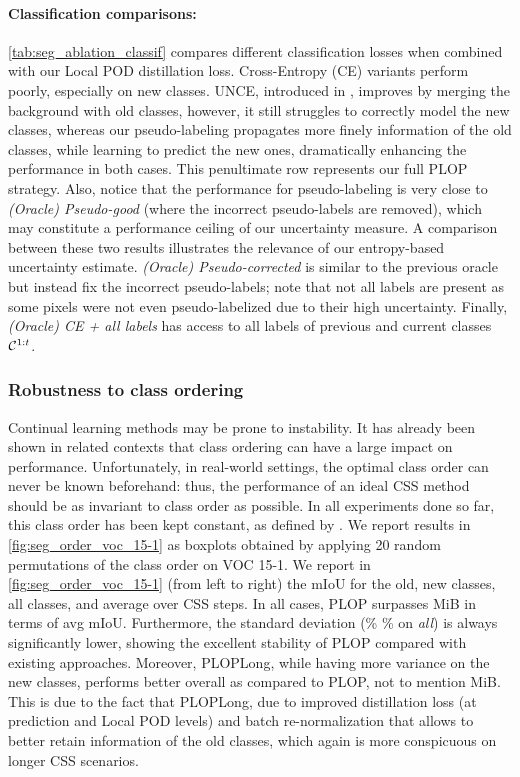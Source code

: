 \paragraph{Classification comparisons:} \autoref{tab:seg_ablation_classif} compares different
classification losses when combined with our Local POD distillation loss. Cross-Entropy (CE)
variants perform poorly, especially on new classes. UNCE, introduced in
\citep{cermelli2020modelingthebackground}, improves by merging the background with old classes,
however, it still struggles to correctly model the new classes, whereas our pseudo-labeling
propagates more finely information of the old classes, while learning to predict the new ones,
dramatically enhancing the performance in both cases. This penultimate row represents our full PLOP
strategy. Also, notice that the performance for pseudo-labeling is very close to \textit{(Oracle)
    Pseudo-good} (where the incorrect pseudo-labels are removed), which may constitute a performance
ceiling of our uncertainty measure. A comparison between these two results illustrates the relevance
of our entropy-based uncertainty estimate. \textit{(Oracle) Pseudo-corrected} is similar to the
previous oracle but instead fix the incorrect pseudo-labels; note that not all labels are present as
some pixels were not even pseudo-labelized due to their high uncertainty. Finally, \textit{(Oracle)
    CE + all labels} has access to all labels of previous and current classes $\mathcal{C}^{1:t}$.

\subsubsection{Robustness to class ordering}

Continual learning methods may be prone to instability. It has already been shown in related
contexts \citep{kim2019medic} that class ordering can have a large impact on performance.
Unfortunately, in real-world settings, the optimal class order can never be known beforehand: thus,
the performance of an ideal \ac{CSS} method should be as invariant to class order as possible. In
all experiments done so far, this class order has been kept constant, as defined by
\citet{cermelli2020modelingthebackground}. We report results in \autoref{fig:seg_order_voc_15-1} as
boxplots obtained by applying 20 random permutations of the class order on VOC 15-1. We report in
\autoref{fig:seg_order_voc_15-1} (from left to right) the \ac{mIoU} for the old, new classes, all
classes, and average over \ac{CSS} steps. In all cases, PLOP surpasses MiB in terms of avg
\ac{mIoU}. Furthermore, the standard deviation (\% \% on \textit{all}) is always
significantly lower, showing the excellent stability of PLOP compared with existing approaches.
Moreover, PLOPLong, while having more variance on the new classes, performs better overall as
compared to PLOP, not to mention MiB. This is due to the fact that PLOPLong, due to improved
distillation loss (at prediction and Local POD levels) and batch re-normalization that allows to
better retain information of the old classes, which again is more conspicuous on longer \ac{CSS}
scenarios.


